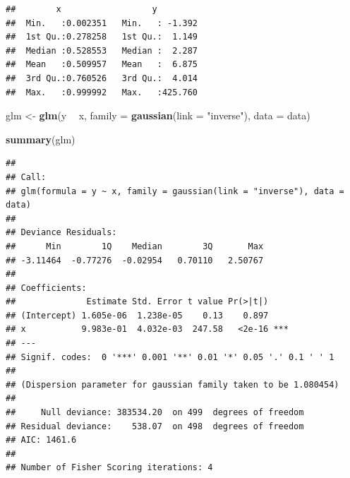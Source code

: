 \documentclass[
  openany]{book}
\newenvironment{Shaded}{\begin{snugshade}}{\end{snugshade}}
\newcommand{\ControlFlowTok}[1]{\textcolor[rgb]{0.13,0.29,0.53}{\textbf{#1}}}
\newcommand{\DataTypeTok}[1]{\textcolor[rgb]{0.13,0.29,0.53}{#1}}
\newcommand{\DecValTok}[1]{\textcolor[rgb]{0.00,0.00,0.81}{#1}}
\newcommand{\KeywordTok}[1]{\textcolor[rgb]{0.13,0.29,0.53}{\textbf{#1}}}
\newcommand{\NormalTok}[1]{#1}
\newcommand{\OperatorTok}[1]{\textcolor[rgb]{0.81,0.36,0.00}{\textbf{#1}}}
\newcommand{\StringTok}[1]{\textcolor[rgb]{0.31,0.60,0.02}{#1}}
\begin{document}
\begin{Shaded}
\end{Shaded}

\begin{verbatim}
##        x                  y          
##  Min.   :0.002351   Min.   : -1.392  
##  1st Qu.:0.278258   1st Qu.:  1.149  
##  Median :0.528553   Median :  2.287  
##  Mean   :0.509957   Mean   :  6.875  
##  3rd Qu.:0.760526   3rd Qu.:  4.014  
##  Max.   :0.999992   Max.   :425.760
\end{verbatim}

\begin{Shaded}
\begin{Highlighting}[]
\NormalTok{glm <-}\StringTok{ }\KeywordTok{glm}\NormalTok{(y }\OperatorTok{~}\StringTok{ }\NormalTok{x, }\DataTypeTok{family =} \KeywordTok{gaussian}\NormalTok{(}\DataTypeTok{link =} \StringTok{"inverse"}\NormalTok{), }\DataTypeTok{data =}\NormalTok{ data)}

\KeywordTok{summary}\NormalTok{(glm)}
\end{Highlighting}
\end{Shaded}

\begin{verbatim}
## 
## Call:
## glm(formula = y ~ x, family = gaussian(link = "inverse"), data = data)
## 
## Deviance Residuals: 
##      Min        1Q    Median        3Q       Max  
## -3.11464  -0.77276  -0.02954   0.70110   2.50767  
## 
## Coefficients:
##              Estimate Std. Error t value Pr(>|t|)    
## (Intercept) 1.605e-06  1.238e-05    0.13    0.897    
## x           9.983e-01  4.032e-03  247.58   <2e-16 ***
## ---
## Signif. codes:  0 '***' 0.001 '**' 0.01 '*' 0.05 '.' 0.1 ' ' 1
## 
## (Dispersion parameter for gaussian family taken to be 1.080454)
## 
##     Null deviance: 383534.20  on 499  degrees of freedom
## Residual deviance:    538.07  on 498  degrees of freedom
## AIC: 1461.6
## 
## Number of Fisher Scoring iterations: 4
\end{verbatim}
\end{document}

